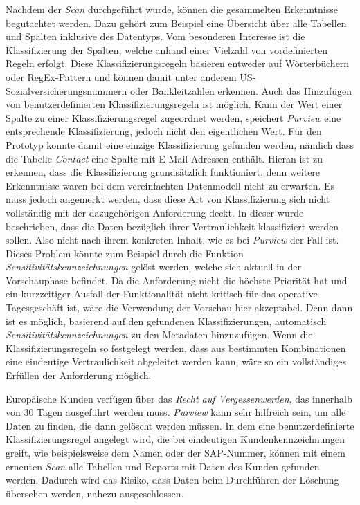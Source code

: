 Nachdem der \textit{Scan} durchgeführt wurde, können die gesammelten Erkenntnisse begutachtet werden. Dazu gehört zum Beispiel eine Übersicht über alle Tabellen und Spalten inklusive des Datentyps. Vom besonderen Interesse ist die Klassifizierung der Spalten, welche anhand einer Vielzahl von vordefinierten Regeln erfolgt. Diese Klassifizierungsregeln basieren entweder auf Wörterbüchern oder RegEx-Pattern und können damit unter anderem US-Sozialversicherungsnummern oder Bankleitzahlen erkennen. Auch das Hinzufügen von benutzerdefinierten Klassifizierungsregeln ist möglich. Kann der Wert einer Spalte zu einer Klassifizierungsregel zugeordnet werden, speichert \textit{Purview} eine entsprechende Klassifizierung, jedoch nicht den eigentlichen Wert. Für den Prototyp konnte damit eine einzige Klassifizierung gefunden werden, nämlich dass die Tabelle \textit{Contact} eine Spalte mit E-Mail-Adressen enthält. Hieran ist zu erkennen, dass die Klassifizierung grundsätzlich funktioniert, denn weitere Erkenntnisse waren bei dem vereinfachten Datenmodell nicht zu erwarten. Es muss jedoch angemerkt werden, dass diese Art von Klassifizierung sich nicht vollständig mit der dazugehörigen Anforderung deckt. In dieser wurde beschrieben, dass die  Daten bezüglich ihrer Vertraulichkeit klassifiziert werden sollen. Also nicht nach ihrem konkreten Inhalt, wie es bei \textit{Purview} der Fall ist. Dieses Problem könnte zum Beispiel durch die Funktion \textit{Sensitivitätskennzeichnungen} gelöst werden, welche sich aktuell in der Vorschauphase befindet. Da die Anforderung nicht die höchste Priorität hat und ein kurzzeitiger Ausfall der Funktionalität nicht kritisch für das operative Tagesgeschäft ist, wäre die Verwendung der Vorschau hier akzeptabel. Denn dann ist es möglich, basierend auf den gefundenen Klassifizierungen, automatisch \textit{Sensitivitätskennzeichnungen} zu den Metadaten hinzuzufügen. Wenn die Klassifizierungsregeln so festgelegt werden, dass aus bestimmten Kombinationen eine eindeutige Vertraulichkeit abgeleitet werden kann, wäre so ein vollständiges Erfüllen der Anforderung möglich.

Europäische Kunden verfügen über das \textit{Recht auf Vergessenwerden}, das innerhalb von 30 Tagen ausgeführt werden muss. \textit{Purview} kann sehr hilfreich sein, um alle Daten zu finden, die dann gelöscht werden müssen. In dem eine benutzerdefinierte Klassifizierungsregel angelegt wird, die bei eindeutigen Kundenkennzeichnungen greift, wie beispielsweise dem Namen oder der SAP-Nummer, können mit einem erneuten \textit{Scan} alle Tabellen und Reports mit Daten des Kunden gefunden werden. Dadurch wird das Risiko, dass Daten beim Durchführen der Löschung übersehen werden, nahezu ausgeschlossen.

